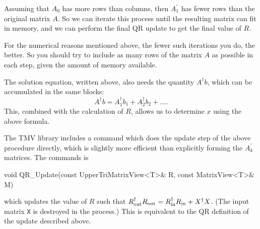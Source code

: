 \documentclass[twoside,letterpaper,11pt]{article}
\renewcommand{\tt}[1]{{\lstinline {#1}}}
\begin{document}
Assuming that $A_0$ has more rows than columns, 
then $A_1^\prime$ has fewer rows than
the original matrix $A$.  So we can iterate this process until the 
resulting matrix can fit in memory, and we can perform the final QR update
to get the final value of $R$.

For the numerical reasons mentioned above, 
the fewer such iterations you do, the better.  So you should try to include as many
rows of the matrix $A$ as possible in each step, given the amount of memory
available.

The solution equation, written above, also needs the quantity $A^\dagger b$, which
can be accumulated in the same blocks:
\begin{equation*}
A^\dagger b = A_1^\dagger b_1 + A_2^\dagger b_2 + ....
\end{equation*}
This, combined with the calculation of $R$, allows us to determine $x$ using the above formula.

The TMV library includes a command which does the update step of the above procedure
directly, which is slightly more efficient than explicitly forming the $A_k^\prime$ matrices.
The commands is
\begin{tmvcode}
void QR_Update(const UpperTriMatrixView<T>& R, const MatrixView<T>& M)
\end{tmvcode}
which updates the value of $R$ such that $R_{\rm out}^\dagger R_{\rm out} =
R_{\rm in}^\dagger R_{\rm in} + X^\dagger X$.
(The input matrix \tt{X} is destroyed in the process.)  This is equivalent to the QR
definition of the update described above.
\end{document}
